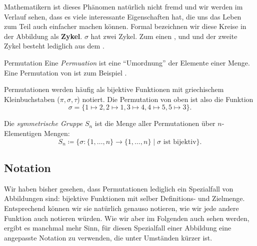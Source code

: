 \documentclass[../../main.tex]{subfiles}
\begin{document}
Mathematikern ist dieses Phänomen natürlich nicht fremd und wir werden im Verlauf sehen, dass es viele interessante Eigenschaften hat, die uns das Leben zum Teil auch einfacher machen können. Formal bezeichnen wir diese Kreise in der Abbildung als \textbf{Zykel}. $\sigma$ hat zwei Zykel. Zum einen \AceDiamond{}, \AceHeart{} und \AceSpade{} und der zweite Zykel besteht lediglich aus dem \AceClub{}.

\begin{nutshell}{Permutation}
    Eine \emph{Permuation} ist eine \enquote{Umordnung} der Elemente einer Menge.
    Eine Permutation von \blueball\redball\greenball\orangeball\violetball{} ist zum Beispiel \redball\blueball\orangeball\violetball\greenball.
    
    Permutationen werden häufig als bijektive Funktionen mit griechischem Kleinbuchstaben ($\pi, \sigma, \tau$) notiert. Die Permutation von oben ist also die Funktion
    $$\sigma = \{1\mapsto 2, 2 \mapsto 1, 3\mapsto 4, 4\mapsto 5, 5\mapsto 3\}.$$
    
    Die \emph{symmetrische Gruppe} $S_n$ ist die Menge aller Permutationen über $n$-Elementigen Mengen:
    $$S_n \coloneqq \{\sigma\colon \{1,\dots,n\}\to\{1,\dots, n\} \mid \sigma\text{ ist bijektiv}\}.$$
\end{nutshell}

\subsection{Notation}
Wir haben bisher gesehen, dass Permutationen lediglich ein Spezialfall von Abbildungen sind: bijektive Funktionen mit selber Definitions- und Zielmenge. Entsprechend können wir sie natürlich genauso notieren, wie wir jede andere Funktion auch notieren würden. Wie wir aber im Folgenden auch sehen werden, ergibt es manchmal mehr Sinn, für diesen Spezialfall einer Abbildung eine angepasste Notation zu verwenden, die unter Umständen kürzer ist.
\end{document}
